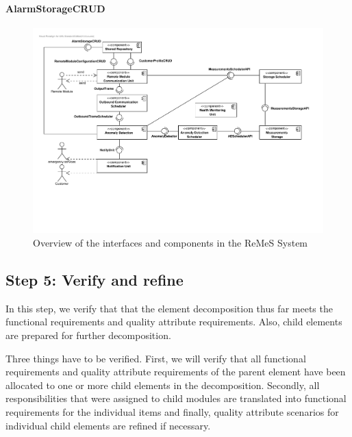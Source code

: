 \npar 

\paragraph{AlarmStorageCRUD}

\npar 

\begin{figure}[H]
	\begin{centering}
		\includegraphics[width=\textwidth]{figs/add-it1-interfaces.pdf}
		\caption{Overview of the interfaces and components in the ReMeS
		System}
		\label{fig:it1/interfaces}
	\end{centering}
\end{figure}

\subsection{Step 5: Verify and refine}
\label{add:it1/verification}

\npar In this step, we verify that that the element decomposition thus far meets
the functional requirements and quality attribute requirements. Also, child
elements are prepared for further decomposition.

\npar Three things have to be verified. First, we will verify that all
functional requirements and quality attribute requirements of the parent element
have been allocated to one or more child elements in the decomposition.
Secondly, all responsibilities that were assigned to child modules are
translated into functional requirements for the individual items and finally,
quality attribute scenarios for individual child elements are refined if
necessary.


